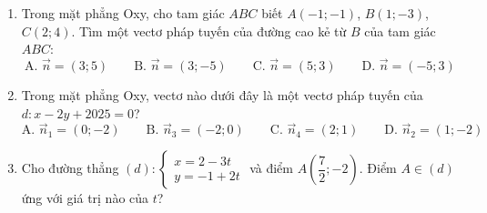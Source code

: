 \documentclass[12pt]{article}
\begin{document}
\begin{enumerate}[label=\textbf{Câu \arabic*:}]
\item Trong mặt phẳng Oxy, cho tam giác $ABC$ biết $A(-1;-1)$, $B(1;-3)$, $C(2;4)$. Tìm một vectơ pháp tuyến của đường cao kẻ từ $B$ của tam giác $ABC$:
\[
\text{A. } \vec{n} = (3; 5) \qquad \text{B. } \vec{n} = (3; -5) \qquad \text{C. } \vec{n} = (5; 3) \qquad \text{D. } \vec{n} = (-5; 3)
\]

\item Trong mặt phẳng Oxy, vectơ nào dưới đây là một vectơ pháp tuyến của $d: x - 2y + 2025 = 0$?
\[
\text{A. } \vec{n}_1 = (0; -2) \qquad \text{B. } \vec{n}_3 = (-2; 0) \qquad \text{C. } \vec{n}_4 = (2; 1) \qquad \text{D. } \vec{n}_2 = (1; -2)
\]

\item Cho đường thẳng $(d): \begin{cases} x = 2 - 3t \\ y = -1 + 2t \end{cases}$ và điểm $A\left(\dfrac{7}{2}; -2\right)$. Điểm $A \in (d)$ ứng với giá trị nào của $t$?
\end{enumerate}
\end{document}
